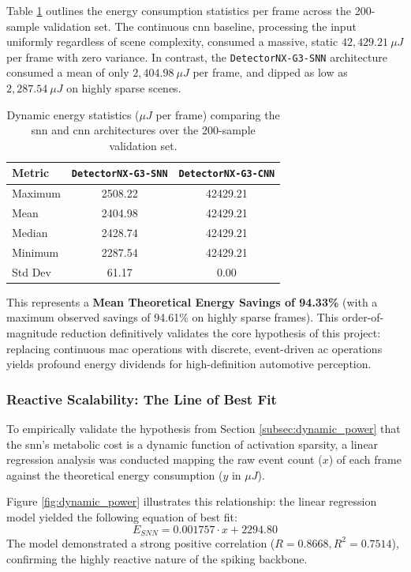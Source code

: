 Table \ref{tab:energy_statistics} outlines the energy consumption statistics per frame across the 200-sample validation set.
The continuous \gls{cnn} baseline, processing the input uniformly regardless of scene complexity, consumed a massive, static $42,429.21\ \mu J$ per frame with zero variance. 
In contrast, the \texttt{DetectorNX-G3-SNN} architecture consumed a mean of only $2,404.98\ \mu J$ per frame, and dipped as low as $2,287.54\ \mu J$ on highly sparse scenes.

\begin{table}[htbp]
\centering
\begin{tabular}{|l|c|c|}
\hline
\textbf{Metric} & \textbf{\texttt{DetectorNX-G3-SNN}} & \textbf{\texttt{DetectorNX-G3-CNN}} \\
\hline
Maximum & 2508.22 & 42429.21 \\
Mean & 2404.98 & 42429.21 \\
Median & 2428.74 & 42429.21 \\
Minimum & 2287.54 & 42429.21 \\
Std Dev & 61.17 & 0.00 \\
\hline
\end{tabular}
\caption[Energy Statistics per Frame]{Dynamic energy statistics ($\mu J$ per frame) comparing the \gls{snn} and \gls{cnn} architectures over the 200-sample validation set.}
\label{tab:energy_statistics}
\end{table}

This represents a \textbf{Mean Theoretical Energy Savings of 94.33\%} (with a maximum observed savings of 94.61\% on highly sparse frames). 
This order-of-magnitude reduction definitively validates the core hypothesis of this project: replacing continuous \gls{mac} operations with discrete, event-driven \gls{ac} operations yields profound energy dividends for high-definition automotive perception.

\subsubsection*{Reactive Scalability: The Line of Best Fit}

To empirically validate the hypothesis from Section \ref{subsec:dynamic_power} that the \gls{snn}'s metabolic cost is a dynamic function of activation sparsity, a linear regression analysis was conducted mapping the raw event count ($x$) of each frame against the theoretical energy consumption ($y$ in $\mu J$).

Figure \ref{fig:dynamic_power} illustrates this relationship: the linear regression model yielded the following equation of best fit:
\begin{equation}
    E_{SNN} = 0.001757 \cdot x + 2294.80
\end{equation}
The model demonstrated a strong positive correlation ($R = 0.8668, R^2 = 0.7514$), confirming the highly reactive nature of the spiking backbone. 


